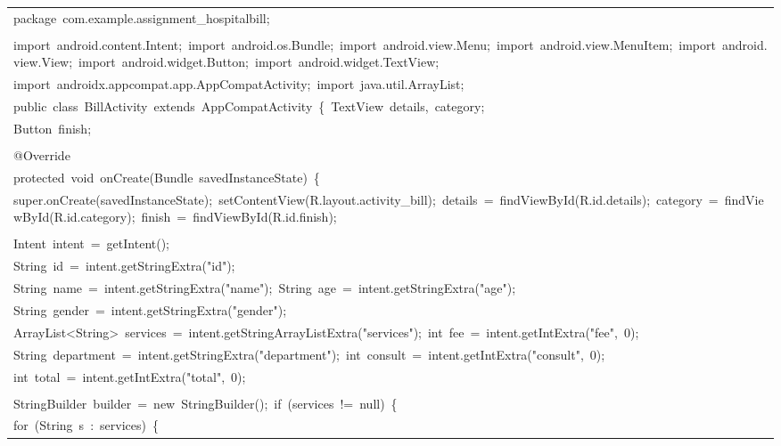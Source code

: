 \documentclass[a4paper,12pt]{article}
\begin{document}
\begin{longtable}{|p{}|}
\hline
{\ttfamily\small package\ com.example.assignment\_hospitalbill;} \\
\strut \\
{\ttfamily\small import\ android.content.Intent;\ import\ android.os.Bundle;\ import\ android.view.Menu;\ import\ android.view.MenuItem;\ import\ android.view.View;\ import\ android.widget.Button;\ import\ android.widget.TextView;} \\
{\ttfamily\small import\ androidx.appcompat.app.AppCompatActivity;\ import\ java.util.ArrayList;} \\
{\ttfamily\small public\ class\ BillActivity\ extends\ AppCompatActivity\ \{\ TextView\ details,\ category;} \\
{\ttfamily\small Button\ finish;} \\
\strut \\
{\ttfamily\small @Override} \\
{\ttfamily\small protected\ void\ onCreate(Bundle\ savedInstanceState)\ \{} \\
{\ttfamily\small super.onCreate(savedInstanceState);\ setContentView(R.layout.activity\_bill);\ details\ =\ findViewById(R.id.details);\ category\ =\ findViewById(R.id.category);\ finish\ =\ findViewById(R.id.finish);} \\
\strut \\
{\ttfamily\small Intent\ intent\ =\ getIntent();} \\
{\ttfamily\small String\ id\ =\ intent.getStringExtra("id");} \\
{\ttfamily\small String\ name\ =\ intent.getStringExtra("name");\ String\ age\ =\ intent.getStringExtra("age");} \\
{\ttfamily\small String\ gender\ =\ intent.getStringExtra("gender");} \\
{\ttfamily\small ArrayList\textless{}String\textgreater{}\ services\ =\ intent.getStringArrayListExtra("services");\ int\ fee\ =\ intent.getIntExtra("fee",\ 0);} \\
{\ttfamily\small String\ department\ =\ intent.getStringExtra("department");\ int\ consult\ =\ intent.getIntExtra("consult",\ 0);} \\
{\ttfamily\small int\ total\ =\ intent.getIntExtra("total",\ 0);} \\
\strut \\
{\ttfamily\small StringBuilder\ builder\ =\ new\ StringBuilder();\ if\ (services\ !=\ null)\ \{} \\
{\ttfamily\small for\ (String\ s\ :\ services)\ \{} \\

\end{longtable}
\end{document}
